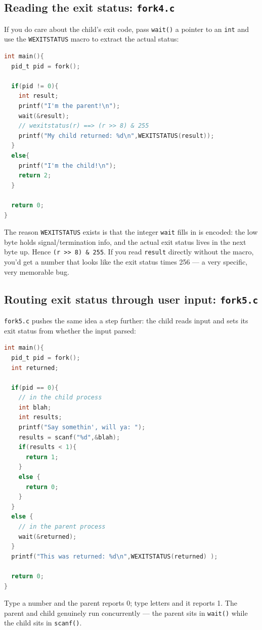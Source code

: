 \documentclass[11pt]{article}
\begin{document}
\subsection*{Reading the exit status: \texttt{fork4.c}}

If you do care about the child's exit code, pass \texttt{wait()} a
pointer to an \texttt{int} and use the \texttt{WEXITSTATUS} macro to
extract the actual status:

\begin{lstlisting}[language=C]
int main(){
  pid_t pid = fork();

  if(pid != 0){
    int result;
    printf("I'm the parent!\n");
    wait(&result);
    // wexitstatus(r) ==> (r >> 8) & 255
    printf("My child returned: %d\n",WEXITSTATUS(result));
  }
  else{
    printf("I'm the child!\n");
    return 2;
  }

  return 0;
}
\end{lstlisting}

The reason \texttt{WEXITSTATUS} exists is that the integer
\texttt{wait} fills in is encoded: the low byte holds signal/termination
info, and the actual exit status lives in the next byte up. Hence
\texttt{(r >> 8) \& 255}. If you read \texttt{result} directly without
the macro, you'd get a number that looks like the exit status times
256 --- a very specific, very memorable bug.

\subsection*{Routing exit status through user input: \texttt{fork5.c}}

\texttt{fork5.c} pushes the same idea a step further: the child reads
input and sets its exit status from whether the input parsed:

\begin{lstlisting}[language=C]
int main(){
  pid_t pid = fork();
  int returned;

  if(pid == 0){
    // in the child process
    int blah;
    int results;
    printf("Say somethin', will ya: ");
    results = scanf("%d",&blah);
    if(results < 1){
      return 1;
    }
    else {
      return 0;
    }
  }
  else {
    // in the parent process
    wait(&returned);
  }
  printf("This was returned: %d\n",WEXITSTATUS(returned) );

  return 0;
}
\end{lstlisting}

Type a number and the parent reports 0; type letters and it reports
1. The parent and child genuinely run concurrently --- the parent
sits in \texttt{wait()} while the child sits in \texttt{scanf()}.
\end{document}

